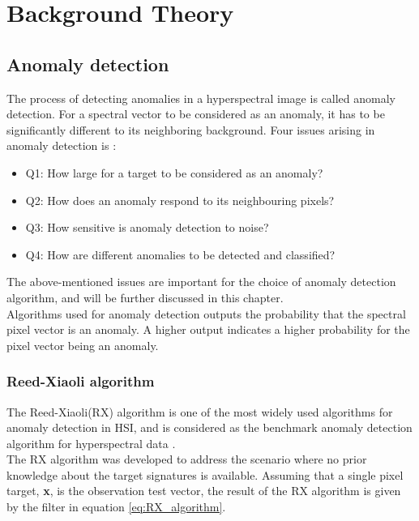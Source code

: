 \newpage
\chapter{Background Theory}
\label{sec:theory}

\section{Anomaly detection}
\label{sec:anomaly_detectors_theory}
The process of detecting anomalies in a hyperspectral image is called anomaly detection. For a spectral vector to be considered as an anomaly, it has to be significantly different to its neighboring background. Four issues arising in anomaly detection is \cite{chang2006characterization}:
\\
 
\begin{itemize}
  \item Q1: How large for a target to be considered as an anomaly?
  \item Q2: How does an anomaly respond to its neighbouring pixels?
  \item Q3: How sensitive is anomaly detection to noise?
  \item Q4: How are different anomalies to be detected and classified?
\end{itemize}

The above-mentioned issues are important for the choice of anomaly detection algorithm, and will be further discussed in this chapter.
\\
Algorithms used for anomaly detection outputs the probability that the spectral pixel vector is an anomaly. A higher output indicates a higher probability for the pixel vector being an anomaly.


\subsection{Reed-Xiaoli algorithm}
\label{sec:RX_theory}
The Reed-Xiaoli(RX) algorithm \cite{reed1990adaptive} is one of the most widely used algorithms for anomaly detection in HSI, and is considered as the benchmark anomaly detection algorithm for hyperspectral data \cite{yang2015dual}.  
\\
The RX algorithm was developed to address the scenario where no prior knowledge about the target signatures is available. Assuming that a single pixel target, \textbf{x}, is the observation test vector, the result of the RX algorithm is given by the filter in equation \ref{eq:RX_algorithm}.

